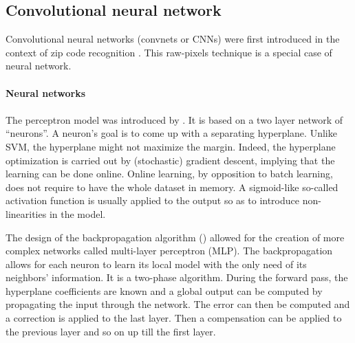 \documentclass[a4paper]{report}
\begin{document}
\subsection{Convolutional neural network}
Convolutional neural networks (convnets or CNNs) were first introduced in the context of zip code recognition \cite{ConvNet}. This raw-pixels technique is a special case of neural network.
\begin{leftbar}
	\paragraph{Neural networks}
	\paragraph{}
	The perceptron model was introduced by \cite{perceptron}. It is based on a two layer network of ``neurons''. A neuron's goal is to come up with a separating hyperplane. Unlike SVM, the hyperplane might not maximize the margin. Indeed, the hyperplane optimization is carried out by (stochastic) gradient descent, implying that the learning can be done online. Online learning, by opposition to batch learning, does not require to have the whole dataset in memory. A sigmoid-like so-called activation function is usually applied to the output so as to introduce non-linearities in the model.
	\par
	The design of the backpropagation algorithm (\cite{backpropagation}) allowed for the creation of more complex networks called multi-layer perceptron (MLP). The backpropagation allows for each neuron to learn its local model with the only need of its neighbors' information. It is a two-phase algorithm. During the forward pass, the hyperplane coefficients are known and a global output can be computed by propagating the input through the network. The error can then be computed and a correction is applied to the last layer. Then a compensation can be applied to the previous layer and so on up till the first layer. 
\end{leftbar}	
\end{document}
